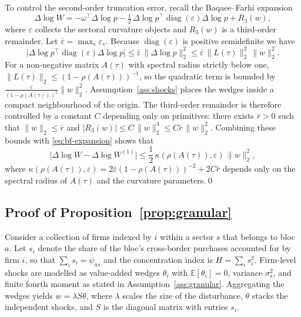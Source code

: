 To control the second-order truncation error, recall the Baqaee--Farhi expansion
\begin{equation}
\label{eq:bf-expansion}
    \Delta \log W = -\omega^{\top}\Delta\log p - \tfrac{1}{2}\,\Delta\log p^{\top}\operatorname{diag}(\varepsilon)\Delta\log p + R_3(w),
\end{equation}
where $\varepsilon$ collects the sectoral curvature objects and $R_3(w)$ is a third-order remainder. Let $\bar{\varepsilon} = \max_s \varepsilon_s$. Because $\operatorname{diag}(\varepsilon)$ is positive semidefinite we have
\begin{equation*}
    \bigl|\Delta\log p^{\top}\operatorname{diag}(\varepsilon)\Delta\log p\bigr| \leq \bar{\varepsilon}\,\|\Delta\log p\|_2^2 \leq \bar{\varepsilon}\,\|L(\tau)\|_2^2\,\|w\|_2^2.
\end{equation*}
For a non-negative matrix $A(\tau)$ with spectral radius strictly below one, $\|L(\tau)\|_2 \leq (1-\rho(A(\tau)))^{-1}$, so the quadratic term is bounded by $\frac{\bar{\varepsilon}}{(1-\rho(A(\tau)))^{2}}\|w\|_2^2$. Assumption~\ref{ass:shocks} places the wedges inside a compact neighbourhood of the origin. The third-order remainder is therefore controlled by a constant $C$ depending only on primitives: there exists $\bar{r}>0$ such that $\|w\|_2\leq \bar{r}$ and $|R_3(w)| \leq C\,\|w\|_2^3 \leq C\bar{r}\,\|w\|_2^2$. Combining these bounds with \eqref{eq:bf-expansion} shows that
\begin{equation*}
    \bigl|\Delta \log W - \Delta \log W^{(1)}\bigr| \leq \frac{1}{2}\,\kappa(\rho(A(\tau)),\varepsilon)\,\|w\|_2^2,
\end{equation*}
where $\kappa(\rho(A(\tau)),\varepsilon) = 2\bar{\varepsilon}(1-\rho(A(\tau)))^{-2} + 2C\bar{r}$ depends only on the spectral radius of $A(\tau)$ and the curvature parameters.\qed

\subsection{Proof of Proposition~\ref{prop:granular}}
Consider a collection of firms indexed by $i$ within a sector $s$ that belongs to bloc $a$. Let $s_i$ denote the share of the bloc's cross-border purchases accounted for by firm $i$, so that $\sum_i s_i = \psi_{as}$ and the concentration index is $H = \sum_i s_i^2$. Firm-level shocks are modelled as value-added wedges $\theta_i$ with $\mathbb{E}[\theta_i]=0$, variance $\sigma_s^2$, and finite fourth moment as stated in Assumption~\ref{ass:granular}. Aggregating the wedges yields $w = \lambda S\theta$, where $\lambda$ scales the size of the disturbance, $\theta$ stacks the independent shocks, and $S$ is the diagonal matrix with entries $s_i$.

